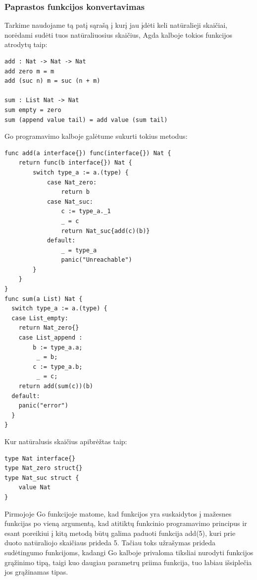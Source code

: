 \documentclass{VUMIFPSkursinis}
\begin{document}
\subsubsection{Paprastos funkcijos konvertavimas}
Tarkime naudojame tą patį sąrašą į kurį jau įdėti keli natūralieji skaičiai, norėdami sudėti tuos natūraliuosius skaičius, Agda kalboje tokios funkcijos atrodytų taip:
\begin{lstlisting}
add : Nat -> Nat -> Nat
add zero m = m
add (suc n) m = suc (n + m)

sum : List Nat -> Nat
sum empty = zero
sum (append value tail) = add value (sum tail)
\end{lstlisting}
Go programavimo kalboje galėtume sukurti tokius metodus:
\begin{lstlisting}[language=GoCust]
func add(a interface{}) func(interface{}) Nat {
	return func(b interface{}) Nat {
		switch type_a := a.(type) {
			case Nat_zero:
				return b
			case Nat_suc:
				c := type_a._1
				_ = c
				return Nat_suc{add(c)(b)}
			default:
				_ = type_a
				panic("Unreachable")
		}
	}
}
func sum(a List) Nat {
  switch type_a := a.(type) {
  case List_empty:
    return Nat_zero{}
	case List_append : 
		b := type_a.a;
		 _ = b;
		c := type_a.b;
		 _ = c;
    return add(sum(c))(b)
  default:
    panic("error")
  }
}
	\end{lstlisting}
	Kur natūralusis skaičius apibrėžtas taip:
	\begin{lstlisting}[language=GoCust]
type Nat interface{}
type Nat_zero struct{}
type Nat_suc struct {
	value Nat
}
\end{lstlisting}

Pirmojoje Go funkcijoje matome, kad funkcijos yra suskaidytos į mažesnes funkcijas po vieną argumentą, kad atitiktų funkcinio programavimo principus ir esant poreikiui į kitą metodą būtų galima paduoti funkcija add(5), kuri prie duoto natūraliojo skaičiaus prideda 5. Tačiau toks užrašymas prideda sudėtingumo funkcijoms, kadangi Go kalboje privaloma tiksliai nurodyti funkcijos grąžinimo tipą, taigi kuo daugiau parametrų priima funkcija, tuo labiau išsiplečia jos grąžinamas tipas.
\end{document}
